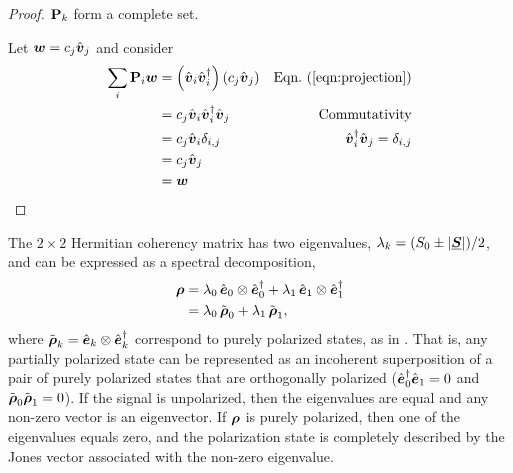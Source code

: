\begin{proof}
${\bf P}_k$ form a complete set.

Let $\mbox{\boldmath $w$} = c_j \hat{\mbox{\boldmath $v$}}_j$ and consider
\begin{align*}
\sum_i \JM{P}_i \Jcol{w} 
&= \left( \hat{\Jcol{v}}_i \hat{\Jcol{v}}_i^\dagger \right)
\left( c_j \hat{\Jcol{v}}_j \right) 
  & \peqn{projection} \\
&= c_j \hat{\Jcol{v}}_i \hat{\Jcol{v}}_i^\dagger \hat{\Jcol{v}}_j 
  & \text{Commutativity} \\
&= c_j \hat{\Jcol{v}}_i \delta_{i,j} 
  & \hat{\Jcol{v}}_i^\dagger \hat{\Jcol{v}}_j = \delta_{i,j} \\
& = c_j \hat{\Jcol{v}}_j \\
& = \Jcol{w}
\end{align*}
\end{proof}



The $2 \times 2$ Hermitian coherency matrix has two eigenvalues, $\lambda_k = (S_0 \pm |\underline{\mbox{\boldmath $S$}}|)/2$, and
can be expressed as a spectral decomposition,
\begin{equation}
\begin{split}
\label{eqn:spectral_decomposition_of_coherency_matrix}
\mbox{\boldmath $\rho$} 
&=  \lambda_0\, \hat{\mbox{\boldmath $e$}}_0 \otimes \hat{\mbox{\boldmath $e$}}_0^\dagger
    + \lambda_1\, \hat{\mbox{\boldmath $e$}}_1 \otimes \hat{\mbox{\boldmath $e$}}_1^\dagger \\
&=  \lambda_0\,\tilde{\mbox{\boldmath $\rho$}}_0 + \lambda_1\,\tilde{\mbox{\boldmath $\rho$}}_1,
\end{split}
\end{equation}
where $\tilde{\mbox{\boldmath $\rho$}}_k = \hat{\mbox{\boldmath $e$}}_k \otimes \hat{\mbox{\boldmath $e$}}_k^\dagger$ correspond to purely polarized states,
as in .
%
That is, any partially polarized state can be represented as an incoherent superposition of a pair of purely polarized states
that are orthogonally polarized ($\hat{\mbox{\boldmath $e$}}_0^\dagger\hat{\mbox{\boldmath $e$}}_1 = 0$ and $\tilde{\mbox{\boldmath $\rho$}}_0 \tilde{\mbox{\boldmath $\rho$}}_1 = 0$).
%
If the signal is unpolarized, then the eigenvalues are equal and
any non-zero vector is an eigenvector.
%
If $\mbox{\boldmath $\rho$}$ is purely polarized, then one of the eigenvalues equals zero, and the polarization state is completely described by the Jones vector associated with the non-zero eigenvalue.

